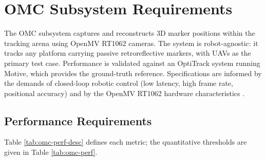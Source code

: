 \section{OMC Subsystem Requirements}

The \gls{OMC} subsystem captures and reconstructs 3D marker positions within the tracking arena using OpenMV RT1062 cameras. The system is robot-agnostic: it tracks any platform carrying passive retroreflective markers, with \gls{UAV}s as the primary test case. Performance is validated against an OptiTrack system running Motive, which provides the ground-truth reference. Specifications are informed by the demands of closed-loop robotic control (low latency, high frame rate, positional accuracy) \parencite{aurandAccuracyMapOptical2017, nagymateMotionCaptureSystem2018} and by the OpenMV RT1062 hardware characteristics \parencite{OpenMVCamRT1062a}.

\subsection{Performance Requirements}

Table \ref{tab:omc-perf-desc} defines each metric; the quantitative thresholds are given in Table \ref{tab:omc-perf}.

